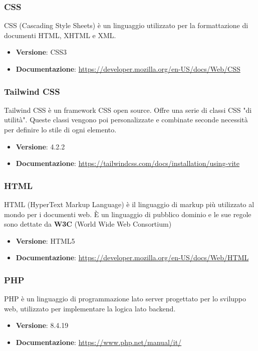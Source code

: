 \documentclass[a4paper,10pt]{article}
\begin{document}
\subsubsection{CSS}
CSS (Cascading Style Sheets) è un linguaggio utilizzato per la formattazione di documenti HTML, XHTML e XML.
\begin{itemize}
    \item \textbf{Versione}: CSS3
    \item \textbf{Documentazione}: \url{https://developer.mozilla.org/en-US/docs/Web/CSS}
\end{itemize}

\subsubsection{Tailwind CSS}
Tailwind CSS è un framework CSS open source. Offre una serie  di classi CSS "di utilità". Queste classi vengono poi personalizzate e combinate seconde necessità per definire lo stile di ogni elemento.
\begin{itemize}
    \item \textbf{Versione}: 4.2.2
    \item \textbf{Documentazione}: \url{https://tailwindcss.com/docs/installation/using-vite}
\end{itemize}

\subsubsection{HTML}
HTML (HyperText Markup Language) è il linguaggio di markup più utilizzato al mondo per i documenti web. È un linguaggio di pubblico dominio e le sue regole sono dettate da \textbf{W3C} (World Wide Web Consortium)
\begin{itemize}
    \item \textbf{Versione}: HTML5
    \item \textbf{Documentazione}: \url{https://developer.mozilla.org/en-US/docs/Web/HTML}
\end{itemize}

\subsubsection{PHP}
PHP è un linguaggio di programmazione lato server progettato per lo sviluppo web, utilizzato per implementare la logica lato backend.
\begin{itemize}
    \item \textbf{Versione}: 8.4.19
    \item \textbf{Documentazione}: \url{https://www.php.net/manual/it/}
\end{itemize}
\end{document}
